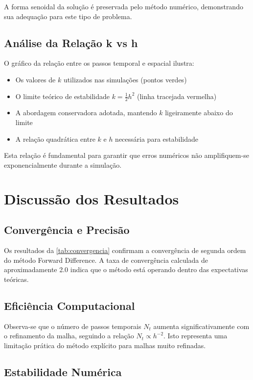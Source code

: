\documentclass[10pt,twocolumn]{article}
\begin{document}
A forma senoidal da solução é preservada pelo método numérico, demonstrando sua adequação para este tipo de problema.

\subsection{Análise da Relação k vs h}

O gráfico da relação entre os passos temporal e espacial ilustra:

\begin{itemize}
    \item Os valores de $k$ utilizados nas simulações (pontos verdes)
    \item O limite teórico de estabilidade $k = \frac{1}{2}h^2$ (linha tracejada vermelha)
    \item A abordagem conservadora adotada, mantendo $k$ ligeiramente abaixo do limite
    \item A relação quadrática entre $k$ e $h$ necessária para estabilidade
\end{itemize}

Esta relação é fundamental para garantir que erros numéricos não amplifiquem-se exponencialmente durante a simulação.

\section{Discussão dos Resultados}

\subsection{Convergência e Precisão}

Os resultados da \autoref{tab:convergencia} confirmam a convergência de segunda ordem do método Forward Difference. A taxa de convergência calculada de aproximadamente 2.0 indica que o método está operando dentro das expectativas teóricas.

\subsection{Eficiência Computacional}

Observa-se que o número de passos temporais $N_t$ aumenta significativamente com o refinamento da malha, seguindo a relação $N_t \propto h^{-2}$. Isto representa uma limitação prática do método explícito para malhas muito refinadas.

\subsection{Estabilidade Numérica}
\end{document}
